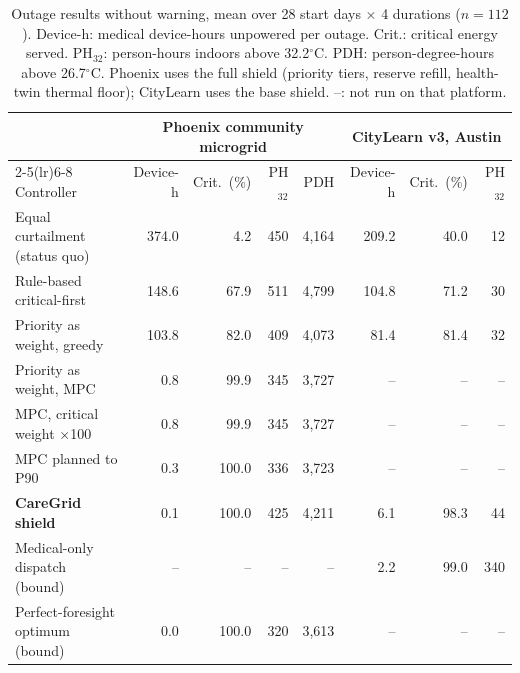 \begin{table}[t]
\centering
\caption{Outage results without warning, mean over 28 start days $\times$ 4 durations ($n=112$). Device-h: medical device-hours unpowered per outage. Crit.: critical energy served. PH$_{32}$: person-hours indoors above 32.2$^\circ$C. PDH: person-degree-hours above 26.7$^\circ$C. Phoenix uses the full shield (priority tiers, reserve refill, health-twin thermal floor); CityLearn uses the base shield. --: not run on that platform.}
\label{tab:main}
\begin{tabular}{lrrrrrrr}
\toprule
 & \multicolumn{4}{c}{Phoenix community microgrid} & \multicolumn{3}{c}{CityLearn v3, Austin} \\
\cmidrule(lr){2-5}\cmidrule(lr){6-8}
Controller & Device-h & Crit.\ (\%) & PH$_{32}$ & PDH & Device-h & Crit.\ (\%) & PH$_{32}$ \\
\midrule
Equal curtailment (status quo) & 374.0 & 4.2 & 450 & 4{,}164 & 209.2 & 40.0 & 12 \\
Rule-based critical-first & 148.6 & 67.9 & 511 & 4{,}799 & 104.8 & 71.2 & 30 \\
Priority as weight, greedy & 103.8 & 82.0 & 409 & 4{,}073 & 81.4 & 81.4 & 32 \\
Priority as weight, MPC & 0.8 & 99.9 & 345 & 3{,}727 & -- & -- & -- \\
\quad MPC, critical weight $\times$100 & 0.8 & 99.9 & 345 & 3{,}727 & -- & -- & -- \\
\quad MPC planned to P90 & 0.3 & 100.0 & 336 & 3{,}723 & -- & -- & -- \\
\textbf{CareGrid shield} & 0.1 & 100.0 & 425 & 4{,}211 & 6.1 & 98.3 & 44 \\
Medical-only dispatch (bound) & -- & -- & -- & -- & 2.2 & 99.0 & 340 \\
Perfect-foresight optimum (bound) & 0.0 & 100.0 & 320 & 3{,}613 & -- & -- & -- \\
\bottomrule
\end{tabular}
\end{table}
